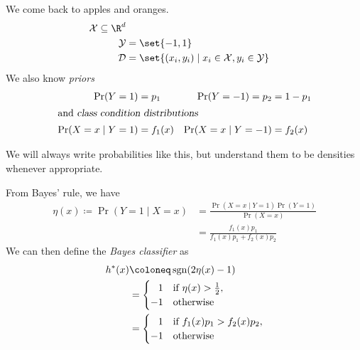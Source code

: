 
We come back to apples and oranges.
\begin{align*}
    \mathcal{X} \subseteq \R^d \\
    \mathcal{Y} &= \set{-1, 1} \\
    \mathcal{D} &= \set{(x_i, y_i) \mid x_i \in \mathcal{X},
        y_i \in \mathcal{Y}}
\end{align*}
We also know \emph{priors} \begin{align*}
    \Pr(Y = 1) &= p_1 & \Pr(Y = -1) = p_2 &= 1 - p_1 \\
    \intertext{and \emph{class condition distributions}}
    \Pr(X = x \mid Y = 1) &= f_1(x) & \Pr(X = x \mid Y = -1) &= f_2(x)
\end{align*}
\begin{remark}
    We will always write probabilities like this, but understand them to be
    densities whenever appropriate.
\end{remark}
From Bayes' rule, we have
\begin{align*}
    \eta(x) \coloneq \Pr(Y = 1 \mid X = x)
        &= \frac{\Pr(X = x \mid Y = 1) \Pr(Y = 1)}{\Pr(X = x)} \\
        &= \frac{f_1(x) p_1}{f_1(x) p_1 + f_2(x) p_2}
\end{align*}
We can then define the \emph{Bayes classifier} as \begin{align*}
    h^*(x) &\coloneq \sgn(2\eta(x) - 1) \\
    &= \begin{cases}
        \hphantom{-}1 & \text{if } \eta(x) > \frac{1}{2}, \\
        -1 & \text{otherwise}
    \end{cases} \\
    &= \begin{cases}
        \hphantom{-}1 & \text{if } f_1(x) p_1 > f_2(x) p_2, \\
        -1 & \text{otherwise}
    \end{cases}
\end{align*}

